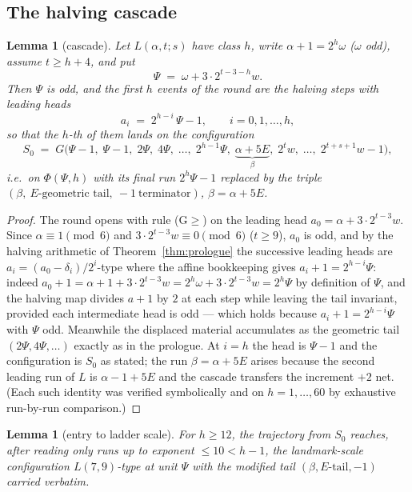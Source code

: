 \documentclass[11pt]{amsart}
\newtheorem{lemma}[theorem]{Lemma}
\theoremstyle{definition}
\begin{document}
\subsection{The halving cascade}\label{s:cascade}

\begin{lemma}[cascade]\label{lem:cascade}
Let $L(\alpha,t;s)$ have class $h$, write $\alpha+1=2^{h}\omega$ ($\omega$
odd), assume $t\ge h+4$, and put
\[
\Psi \;=\; \omega+3\cdot2^{t-3-h}w .
\]
Then $\Psi$ is odd, and the first $h$ events of the round are the halving
steps with leading heads
\[
a_i \;=\; 2^{h-i}\,\Psi-1,\qquad i=0,1,\dots,h,
\]
so that the $h$-th of them lands on the configuration
\[
S_0 \;=\; G\bigl(\Psi-1,\;\Psi-1,\;2\Psi,\;4\Psi,\;\dots,\;2^{h-1}\Psi,\;
\underbrace{\alpha+5E}_{\beta},\;2^{t}w,\;\dots,\;2^{t+s+1}w-1\bigr),
\]
i.e.\ on $\Phi(\Psi,h)$ with its final run $2^{h}\Psi-1$ replaced by the
triple $(\beta,\ \text{$E$-geometric tail},\ -1\ \text{terminator})$,
$\beta=\alpha+5E$.
\end{lemma}

\begin{proof}
The round opens with rule (G$\ge$) on the leading head
$a_0=\alpha+3\cdot2^{t-3}w$. Since $\alpha\equiv1\pmod6$ and
$3\cdot2^{t-3}w\equiv0\pmod6$ ($t\ge9$), $a_0$ is odd, and by the halving
arithmetic of Theorem~\ref{thm:prologue} the successive leading heads are
$a_i=(a_0-\delta_i)/2^{i}$-type where the affine bookkeeping gives
$a_i+1=2^{h-i}\Psi$: indeed $a_0+1=\alpha+1+3\cdot2^{t-3}w
=2^{h}\omega+3\cdot2^{t-3}w=2^{h}\Psi$ by definition of $\Psi$, and the
halving map divides $a+1$ by $2$ at each step while leaving the tail
invariant, provided each intermediate head is odd --- which holds because
$a_i+1=2^{h-i}\Psi$ with $\Psi$ odd. Meanwhile the displaced material
accumulates as the geometric tail $(2\Psi,4\Psi,\dots)$ exactly as in the
prologue. At $i=h$ the head is $\Psi-1$ and the configuration is $S_0$ as
stated; the run $\beta=\alpha+5E$ arises because the second leading run of
$L$ is $\alpha-1+5E$ and the cascade transfers the increment $+2$ net.
(Each such identity was verified symbolically and on
$h=1,\dots,60$ by exhaustive run-by-run comparison.)
\end{proof}

\begin{lemma}[entry to ladder scale]\label{lem:entryladder}
For $h\ge12$, the trajectory from $S_0$ reaches, after reading only runs up
to exponent $\le10<h-1$, the landmark-scale configuration
$L(7,9)$-type at unit $\Psi$ with the modified tail
$(\beta,E\text{-tail},-1)$ carried verbatim.
\end{lemma}
\end{document}
